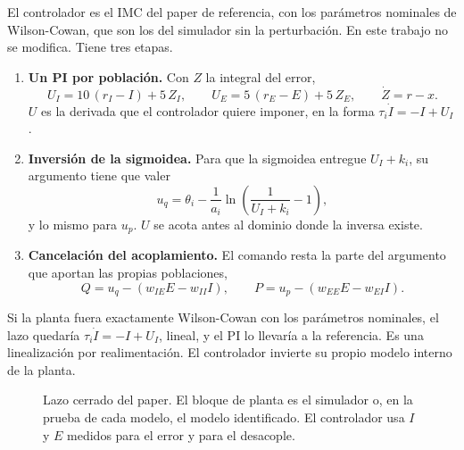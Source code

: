 \documentclass[10pt,a4paper]{article}
\begin{document}
El controlador es el IMC del paper de referencia, con los parámetros nominales de Wilson-Cowan, que son los del simulador sin la perturbación. En este trabajo no se modifica. Tiene tres etapas.

\begin{enumerate}[leftmargin=*,itemsep=0.3em]
\item \textbf{Un PI por población.} Con $Z$ la integral del error,
\[
U_I = 10\,(r_I - I) + 5\,Z_I, \qquad U_E = 5\,(r_E - E) + 5\,Z_E, \qquad \dot Z = r - x .
\]
$U$ es la derivada que el controlador quiere imponer, en la forma $\tau_i \dot I = -I + U_I$.
\item \textbf{Inversión de la sigmoidea.} Para que la sigmoidea entregue $U_I + k_i$, su argumento tiene que valer
\[
u_q = \theta_i - \frac{1}{a_i}\ln\!\left(\frac{1}{U_I + k_i} - 1\right),
\]
y lo mismo para $u_p$. $U$ se acota antes al dominio donde la inversa existe.
\item \textbf{Cancelación del acoplamiento.} El comando resta la parte del argumento que aportan las propias poblaciones,
\[
Q = u_q - (w_{IE}E - w_{II}I), \qquad P = u_p - (w_{EE}E - w_{EI}I).
\]
\end{enumerate}

Si la planta fuera exactamente Wilson-Cowan con los parámetros nominales, el lazo quedaría $\tau_i \dot I = -I + U_I$, lineal, y el PI lo llevaría a la referencia. Es una linealización por realimentación. El controlador invierte su propio modelo interno de la planta.

\begin{figure}[H]
\centering
{}
\caption{Lazo cerrado del paper. El bloque de planta es el simulador o, en la prueba de cada modelo, el modelo identificado. El controlador usa $I$ y $E$ medidos para el error y para el desacople.}
\label{fig:lazo}
\end{figure}
\end{document}
